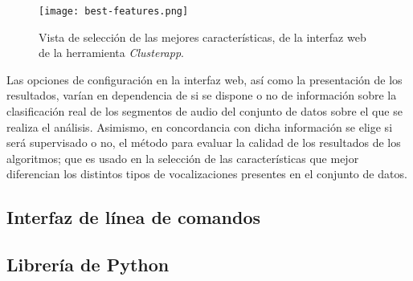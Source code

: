 \begin{figure}[!h]
    \centering
    \texttt{[image: best-features.png]}
    \caption{Vista de selección de las mejores características, de la interfaz web de la herramienta \textit{Clusterapp}.}
    \label{img:best-features}
\end{figure}

Las opciones de configuración en la interfaz web, así como la presentación de los resultados, varían en dependencia de si se dispone o no de información sobre la clasificación real de los segmentos de audio del conjunto de datos sobre el que se realiza el análisis.
Asimismo, en concordancia con dicha información se elige si será supervisado o no, el método para evaluar la calidad de los resultados de los algoritmos;
que es usado en la selección de las características que mejor diferencian los distintos tipos de vocalizaciones presentes en el conjunto de datos.

\subsection{Interfaz de línea de comandos}\label{subsec:CLI}

\subsection{Librería de Python}\label{subsec:libreríaDePython}
